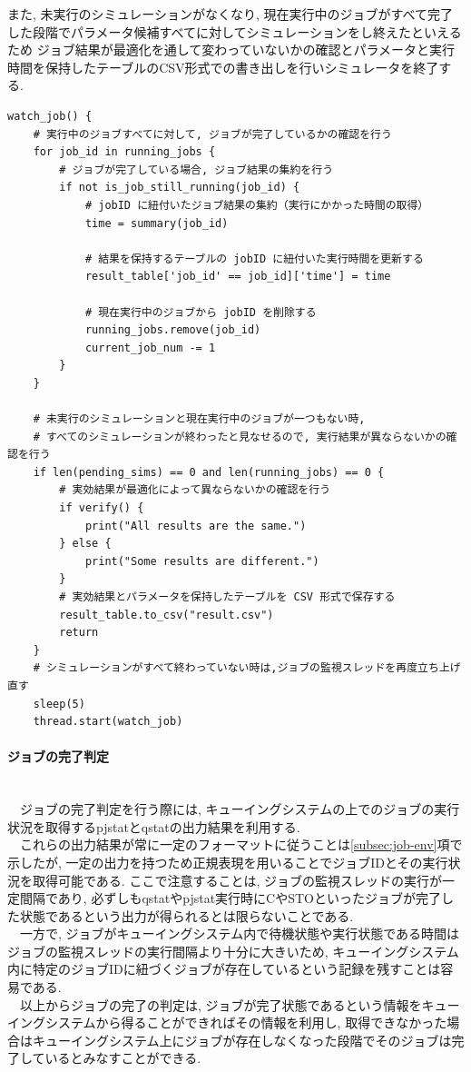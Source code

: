 また, 未実行のシミュレーションがなくなり, 現在実行中のジョブがすべて完了した段階でパラメータ候補すべてに対してシミュレーションをし終えたといえるため
ジョブ結果が最適化を通して変わっていないかの確認とパラメータと実行時間を保持したテーブルのCSV形式での書き出しを行いシミュレータを終了する.\\
{\footnotesize
\begin{lstlisting}[title=ジョブ実行の監視と後処理　疑似コード, frame=single]
watch_job() {
    # 実行中のジョブすべてに対して, ジョブが完了しているかの確認を行う
    for job_id in running_jobs {
        # ジョブが完了している場合, ジョブ結果の集約を行う
        if not is_job_still_running(job_id) {
            # jobID に紐付いたジョブ結果の集約（実行にかかった時間の取得）
            time = summary(job_id)

            # 結果を保持するテーブルの jobID に紐付いた実行時間を更新する
            result_table['job_id' == job_id]['time'] = time

            # 現在実行中のジョブから jobID を削除する
            running_jobs.remove(job_id)
            current_job_num -= 1
        }
    }

    # 未実行のシミュレーションと現在実行中のジョブが一つもない時,
    # すべてのシミュレーションが終わったと見なせるので, 実行結果が異ならないかの確認を行う
    if len(pending_sims) == 0 and len(running_jobs) == 0 {
        # 実効結果が最適化によって異ならないかの確認を行う
        if verify() {
            print("All results are the same.")
        } else {
            print("Some results are different.")
        }
        # 実効結果とパラメータを保持したテーブルを CSV 形式で保存する
        result_table.to_csv("result.csv")
        return
    }
    # シミュレーションがすべて終わっていない時は,ジョブの監視スレッドを再度立ち上げ直す
    sleep(5)
    thread.start(watch_job)
\end{lstlisting}
}

\paragraph{ジョブの完了判定}~\\
　ジョブの完了判定を行う際には, キューイングシステムの上でのジョブの実行状況を取得するpjstatとqstatの出力結果を利用する.\\
　これらの出力結果が常に一定のフォーマットに従うことは\ref{subsec:job-env}項で示したが, 一定の出力を持つため正規表現を用いることでジョブIDとその実行状況を取得可能である.
ここで注意することは, ジョブの監視スレッドの実行が一定間隔であり,
必ずしもqstatやpjstat実行時にCやSTOといったジョブが完了した状態であるという出力が得られるとは限らないことである.\\
　一方で, ジョブがキューイングシステム内で待機状態や実行状態である時間はジョブの監視スレッドの実行間隔より十分に大きいため,
キューイングシステム内に特定のジョブIDに紐づくジョブが存在しているという記録を残すことは容易である.\\
　以上からジョブの完了の判定は, ジョブが完了状態であるという情報をキューイングシステムから得ることができればその情報を利用し,
取得できなかった場合はキューイングシステム上にジョブが存在しなくなった段階でそのジョブは完了しているとみなすことができる.\\

